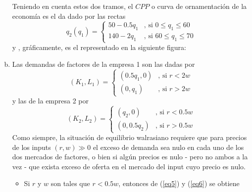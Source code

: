 \begin{enumerate}[a)]
\begin{itemize}
			\end{itemize}
	Teniendo en cuenta estos dos tramos, el $CPP$ o curva de ornamentación de la economía es el da dado por las rectas
		\begin{equation}
			q_2(q_1) =
				\begin{cases}
					50 -0.5q_1 & \text{, si } 0 \leq q_1 \leq 60 \\
					140 - 2q_1 & \text{, si } 60 \leq q_1 \leq 70
				\end{cases} \label{eq4} 
		\end{equation}
	y , gráficamente, es el representado en la siguiente figura:
			\begin{center}
			\end{center}
	\item Las demandas de factores de la empresa 1 son las dadas por
			\begin{equation}
				(K_1, L_1) =
					\begin{cases}
						(0.5q_1,0) & \text{, si } r < 2w\\
						(0,q_1)    & \text{, si } r > 2w
					\end{cases} \label{eq5} 
			\end{equation}
	y las de la empresa 2 por
			\begin{equation}
				(K_2, L_2) =
					\begin{cases}
						(q_2,0) & \text{, si } r < 0.5w\\
						(0,0.5q_2)    & \text{, si } r > 0.5w
					\end{cases} \label{eq6} 
			\end{equation}
	Como siempre, la situación de equilibrio walrasiano requiere que para precios de los inputs $(r,w) \gg 0$ el exceso de demanda sea nulo en cada uno de los dos mercados de factores, o bien si algún precios es nulo - pero no ambos a la vez -  que exista exceso de oferta en el mercado del input cuyo precio es nulo.
		\begin{itemize}
			\item Si $r$ y $w$ son tales que $r < 0.5w$, entonces de (\ref{eq5}) y (\ref{eq6}) se obtiene

\end{itemize}
\end{enumerate}
